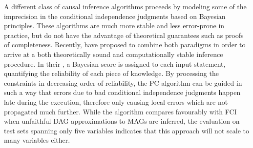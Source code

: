 A different class of causal inference algorithms proceeds by modeling some of the imprecision in the conditional independence judgments based on Bayesian principles. These algorithms are much more stable and less error-prone in practice, but do not have the advantage of theoretical guarantees such as proofs of completeness. Recently, \cite{claassen_heskes_2012} have proposed to combine both paradigms in order to arrive at a both theoretically sound and computationally stable inference procedure. In their , a Bayesian score is assigned to each input statement, quantifying the reliability of each piece of knowledge. By processing the constraints in decreasing order of reliability, the PC algorithm can be guided in such a way that errors due to bad conditional independence judgments happen late during the execution, therefore only causing local errors which are not propagated much further. While the algorithm compares favourably with FCI when unfaithful DAG approximations to MAGs are 
inferred, the evaluation on test sets spanning only five variables indicates that this approach will not scale to many variables either.
